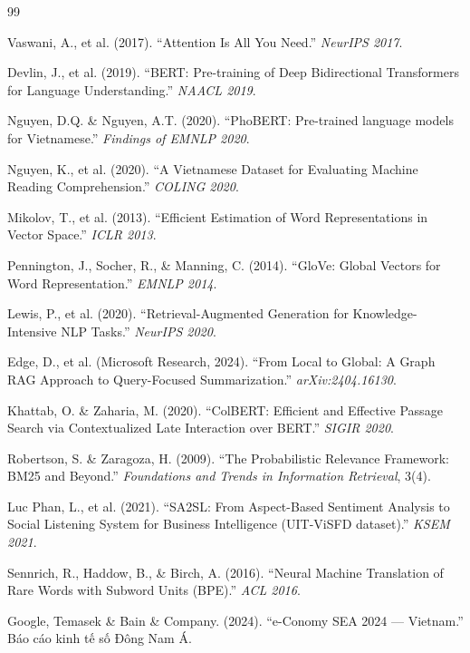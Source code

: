 \documentclass[12pt,a4paper]{article}
\begin{document}
\begin{thebibliography}{99}

Vaswani, A., et al. (2017). ``Attention Is All You Need.'' \textit{NeurIPS 2017}.

Devlin, J., et al. (2019). ``BERT: Pre-training of Deep Bidirectional Transformers for Language Understanding.'' \textit{NAACL 2019}.

Nguyen, D.Q. \& Nguyen, A.T. (2020). ``PhoBERT: Pre-trained language models for Vietnamese.'' \textit{Findings of EMNLP 2020}.

Nguyen, K., et al. (2020). ``A Vietnamese Dataset for Evaluating Machine Reading Comprehension.'' \textit{COLING 2020}.

Mikolov, T., et al. (2013). ``Efficient Estimation of Word Representations in Vector Space.'' \textit{ICLR 2013}.

Pennington, J., Socher, R., \& Manning, C. (2014). ``GloVe: Global Vectors for Word Representation.'' \textit{EMNLP 2014}.

Lewis, P., et al. (2020). ``Retrieval-Augmented Generation for Knowledge-Intensive NLP Tasks.'' \textit{NeurIPS 2020}.

Edge, D., et al. (Microsoft Research, 2024). ``From Local to Global: A Graph RAG Approach to Query-Focused Summarization.'' \textit{arXiv:2404.16130}.

Khattab, O. \& Zaharia, M. (2020). ``ColBERT: Efficient and Effective Passage Search via Contextualized Late Interaction over BERT.'' \textit{SIGIR 2020}.

Robertson, S. \& Zaragoza, H. (2009). ``The Probabilistic Relevance Framework: BM25 and Beyond.'' \textit{Foundations and Trends in Information Retrieval}, 3(4).

Luc Phan, L., et al. (2021). ``SA2SL: From Aspect-Based Sentiment Analysis to Social Listening System for Business Intelligence (UIT-ViSFD dataset).'' \textit{KSEM 2021}.

Sennrich, R., Haddow, B., \& Birch, A. (2016). ``Neural Machine Translation of Rare Words with Subword Units (BPE).'' \textit{ACL 2016}.

Google, Temasek \& Bain \& Company. (2024). ``e-Conomy SEA 2024 --- Vietnam.'' Báo cáo kinh tế số Đông Nam Á.

\end{thebibliography}
\end{document}
